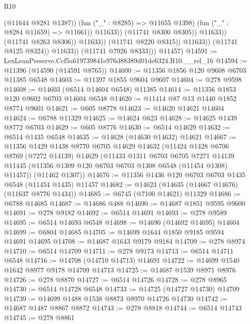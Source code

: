 \begin{lexlean}{R10}
\begin{coremodule}
                                          (@11644 @8281 @1387))
                                        (fun ("_" : @8285) => @11655 @1398)
                                        (fun ("_" : @8284 @11659) => @11661))
                                      @11633))
                                  (@11741 @8300 @8305))
                                @11633))
                            (@11741 @8263 @8306))
                          @11633))
                      (@11741 @8220 @8315))
                    @11633))
                (@11741 @8125 @8324))
              @11633))
          (@11741 @7926 @8333)))
      @11457)
@14591 := LexLeanPreserve.Ccf5a619739841e976d88389d01de6324.R10.__rel_16
@14594 := @11396 (@14590 (@14591 @8765))
@14600 := @11356 @1856 @120 @9608 @6703 @11385 @6548
@14603 := @11397 @1855 @9604 @9607
@14604 := @278 @9598
@14608 := @14603 (@6514 @14604 @6548) @11385
@14614 := @11356 @1853 @120 @9602 @6703 @14604 @6548
@14620 := @11414 @87 @13 @1440 @1852 @8774 @9601
@14621 := @605 @8778
@14623 := @14620 @14621 @14604
@14624 := @6788 @11329
@14625 := @14624 @623
@14628 := @14625 @1439 @8772 @6703
@14629 := @605 @8776
@14630 := @6514 @14629
@14632 := @6514 @1435 @6548
@14635 := @14628 (@14630 @14632) @14621
@14667 := @11356
    @1429
    @1438
    @8770
    @6705
    @14629
    @14632
    (@11424
      @1428
      @6706
      @8769
      (@7272 @14139)
      @14629
      (@11433
        @1311
        @6703
        @6705
        @7271
        @14139
        @11445
        (@11356 @1309 @120 @6703 @6703 @1308 @6548 (@11454 @1308) @11457))
      (@11462 @1307))
@14676 := @11356 @1436 @120 @6703 @6703 @1435 @6548 (@11454 @1435) @11457
@14682 := @14623 (@14635 (@14667 @14676) (@11637 @8776 @1434))
@14685 := @6745 (@7100 @14621) @11329
@14686 := @6788 @14685
@14687 := @14686 @488
@14690 := @14687 @1851 @9595 @9600
@14691 := @278 @9182
@14692 := @6514 @14691
@14693 := @278 @9589
@14695 := @6514 @14693 @6548
@14698 := @14690 (@14692 @14695) @14604
@14699 := @6804 @14685
@14705 := @14699 @1644 @1850 @9185 @9594 @14691 @14695
@14708 := @14687 @1643 @9179 @9184
@14709 := @278 @8974
@14710 := @6514 @14709
@14711 := @278 @9173
@14713 := @6514 @14711 @6548
@14716 := @14708 (@14710 @14713) @14691
@14722 := @14699 @1540 @1642 @8977 @9178 @14709 @14713
@14725 := @14687 @1539 @8971 @8976
@14726 := @278 @8870
@14727 := @6514 @14726
@14728 := @278 @8965
@14730 := @6514 @14728 @6548
@14733 := @14725 (@14727 @14730) @14709
@14739 := @14699 @1488 @1538 @8873 @8970 @14726 @14730
@14742 := @14687 @1487 @8867 @8872
@14743 := @278 @8818
@14744 := @6514 @14743
@14745 := @278 @8861

\end{coremodule}
\end{lexlean}
